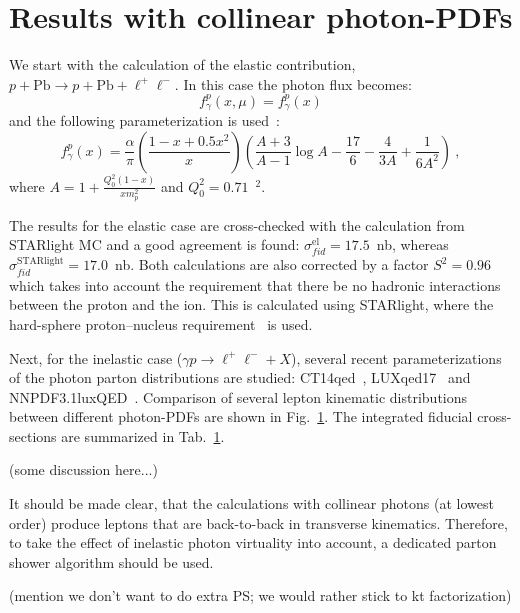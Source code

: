 \section{Results with collinear photon-PDFs}

We start with the calculation of the elastic contribution, $p+\textrm{Pb}\rightarrow p+\textrm{Pb}+ \ell^+\ell^-$.
In this case the photon flux becomes:
\begin{equation}
f_\gamma^{p}(x,\mu) = f_\gamma^{p}(x) 
\end{equation}
and the following parameterization is used~\cite{}:
\begin{equation}
f_\gamma^{p}(x) = \frac{\alpha}{\pi}
\left(
\frac{1-x+0.5x^2}{x}
\right)
\left(
\frac{A+3}{A-1}\log{A}-\frac{17}{6}-\frac{4}{3A}+\frac{1}{6A^2}
\right)~,
\end{equation}
where $A = 1+\frac{Q_0^2(1-x)}{x m_p^2}$ and $Q_0^2 = 0.71$~\GeV$^2$.

The results for the elastic case are cross-checked with the calculation from STARlight MC and a good agreement is found:
$\sigma_{fid}^{\textrm{el}} = 17.5$~nb, whereas $\sigma_{fid}^{\textrm{STARlight}} = 17.0$~nb.
Both calculations are also corrected by a factor $S^2=0.96$ which takes into account the requirement that there be no hadronic interactions between the proton and the ion. This is calculated using STARlight, where the hard-sphere proton--nucleus requirement~\cite{Klein:2016yzr} is used.

Next, for the inelastic case ($\gamma p\rightarrow \ell^+\ell^- + X$), several recent parameterizations of the photon parton distributions are studied: CT14qed~\cite{Schmidt:2015zda}, LUXqed17~\cite{Manohar:2017eqh} and NNPDF3.1luxQED~\cite{Bertone:2017bme}.
Comparison of several lepton kinematic distributions between different photon-PDFs are shown in Fig.~\ref{}.
The integrated fiducial cross-sections are summarized in Tab.~\ref{}.

(some discussion here...)

It should be made clear, that the calculations with collinear photons (at lowest order) produce leptons that are back-to-back in transverse kinematics. Therefore, to take the effect of inelastic photon virtuality into account, a dedicated parton shower algorithm should be used.

(mention we don't want to do extra PS; we would rather stick to kt factorization)
